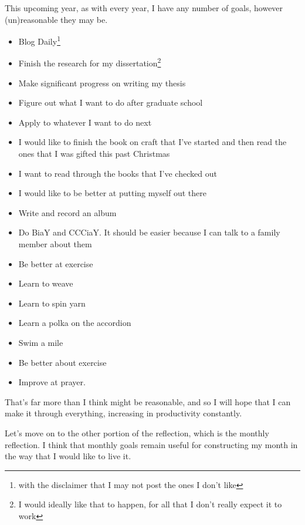 \documentclass[12pt]{article}[titlepage]
\renewcommand{\,}{\textsuperscript{,}}
\begin{document}
This upcoming year, as with every year, I have any number of goals, however (un)reasonable they may be.
\begin{itemize}
\item Blog Daily\footnote{with the disclaimer that I may not post the ones I don't like}
\item Finish the research for my dissertation\footnote{I would ideally like that to happen, for all that I don't really expect it to work}
\item Make significant progress on writing my thesis
\item Figure out what I want to do after graduate school
\item Apply to whatever I want to do next
\item I would like to finish the book on craft that I've started and then read the ones that I was gifted this past Christmas
\item I want to read through the books that I've checked out
\item I would like to be better at putting myself out there
\item Write and record an album
\item Do BiaY and CCCiaY. It should be easier because I can talk to a family member about them
\item Be better at exercise
\item Learn to weave
\item Learn to spin yarn
\item Learn a polka on the accordion
\item Swim a mile
\item Be better about exercise
\item Improve at prayer.
\end{itemize}
That's far more than I think might be reasonable, and so I will hope that I can make it through everything, increasing in productivity constantly.

Let's move on to the other portion of the reflection, which is the monthly reflection.
I think that monthly goals remain useful for constructing my month in the way that I would like to live it.
\end{document}
